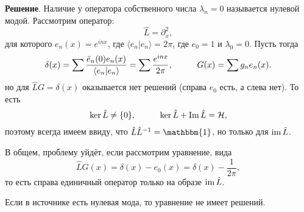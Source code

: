 \textbf{Решение}. Наличие у оператора собственного числа $\lambda_n = 0$ называется нулевой модой. Рассмотрим оператор:
\begin{equation*}
    \hat{L} = \partial_x^2,
\end{equation*}
для которого $e_n (x) = e^{i n x}$, где $\langle e_n | e_n\rangle = 2 \pi$, где $e_0 = 1$ и $\lambda_{0} = 0$. Пусть тогда
\begin{equation*}
    \delta(x) = \sum \frac{\bar{e}_n (0) e_n (x)}{\langle e_n | e_n\rangle} = \sum \frac{e^{i n x}}{2 \pi},
    \hspace{10 mm} 
    G(x) = \sum  g_n e_n (x). 
\end{equation*}
но для $\hat{L} G = \delta(x)$ оказывается нет решений (справа $e_0$ есть, а слева нет). То есть
\begin{equation*}
    \Ker \hat{L} \neq \{0\},
    \hspace{10 mm} 
    \Ker \hat{L} + \Im \hat{L} = \mathcal H,
\end{equation*}
поэтому всегда имеем ввиду, что $\hat{L} \hat{L}^{-1} = \mathbbm{1}$, но только для $\mathop{\mathrm{im}}\nolimits \hat{L}$. 

В общем, проблему уйдёт, если рассмотрим уравнение, вида
\begin{equation*}
    \hat{L} G(x) = \delta(x) - e_0(x) = \delta(x) - \frac{1}{2 \pi},
\end{equation*}
то есть справа единичный оператор только на образе $\mathop{\mathrm{im}}\nolimits \hat{L}$. 



Если в источнике есть нулевая мода, то уравнение не имеет решений. 



